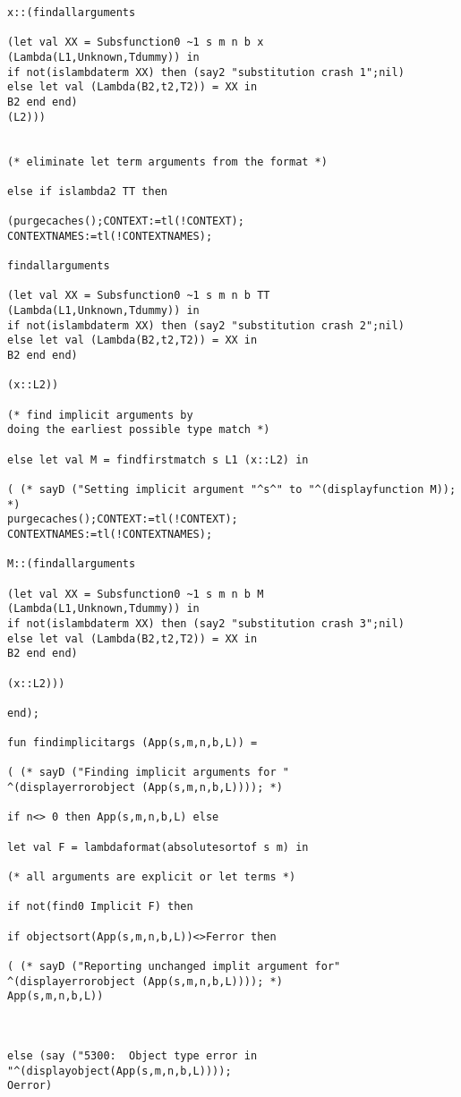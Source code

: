 \documentclass[12pt]{article}
\begin{document}
\begin{verbatim}
x::(findallarguments 

(let val XX = Subsfunction0 ~1 s m n b x 
(Lambda(L1,Unknown,Tdummy)) in
if not(islambdaterm XX) then (say2 "substitution crash 1";nil)
else let val (Lambda(B2,t2,T2)) = XX in
B2 end end)
(L2)))


(* eliminate let term arguments from the format *)

else if islambda2 TT then 

(purgecaches();CONTEXT:=tl(!CONTEXT);
CONTEXTNAMES:=tl(!CONTEXTNAMES);

findallarguments 

(let val XX = Subsfunction0 ~1 s m n b TT
(Lambda(L1,Unknown,Tdummy)) in
if not(islambdaterm XX) then (say2 "substitution crash 2";nil)
else let val (Lambda(B2,t2,T2)) = XX in
B2 end end)

(x::L2))

(* find implicit arguments by 
doing the earliest possible type match *)

else let val M = findfirstmatch s L1 (x::L2) in

( (* sayD ("Setting implicit argument "^s^" to "^(displayfunction M)); *)
purgecaches();CONTEXT:=tl(!CONTEXT);
CONTEXTNAMES:=tl(!CONTEXTNAMES);

M::(findallarguments 

(let val XX = Subsfunction0 ~1 s m n b M
(Lambda(L1,Unknown,Tdummy)) in
if not(islambdaterm XX) then (say2 "substitution crash 3";nil)
else let val (Lambda(B2,t2,T2)) = XX in
B2 end end)

(x::L2)))

end);

fun findimplicitargs (App(s,m,n,b,L)) =

( (* sayD ("Finding implicit arguments for "
^(displayerrorobject (App(s,m,n,b,L)))); *)

if n<> 0 then App(s,m,n,b,L) else

let val F = lambdaformat(absolutesortof s m) in

(* all arguments are explicit or let terms *)

if not(find0 Implicit F) then 

if objectsort(App(s,m,n,b,L))<>Ferror then

( (* sayD ("Reporting unchanged implit argument for"
^(displayerrorobject (App(s,m,n,b,L)))); *)
App(s,m,n,b,L))



else (say ("5300:  Object type error in "^(displayobject(App(s,m,n,b,L))));
Oerror)


\end{verbatim}
\end{document}

